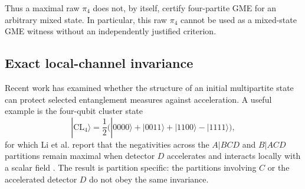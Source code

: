 \documentclass[pdflatex,sn-mathphys-num]{sn-jnl}
\begin{document}
Thus a maximal raw $\pi_4$ does not, by itself, certify four-partite GME for an arbitrary mixed state. In particular, this raw $\pi_4$ cannot be used as a mixed-state GME witness without an independently justified criterion.

\subsection{Exact local-channel invariance}
Recent work has examined whether the structure of an initial multipartite state can protect selected entanglement measures against acceleration. A useful example is the four-qubit cluster state
\begin{equation}
|\mathrm{CL}_{4}\rangle=\frac{1}{2}\bigl(|0000\rangle+|0011\rangle+|1100\rangle-|1111\rangle\bigr),
\label{eq:cluster-state}
\end{equation}
for which Li et al. report that the negativities across the $A|BCD$ and $B|ACD$ partitions remain maximal when detector $D$ accelerates and interacts locally with a scalar field \cite{LiCluster2026}. The result is partition specific: the partitions involving $C$ or the accelerated detector $D$ do not obey the same invariance.
\end{document}
